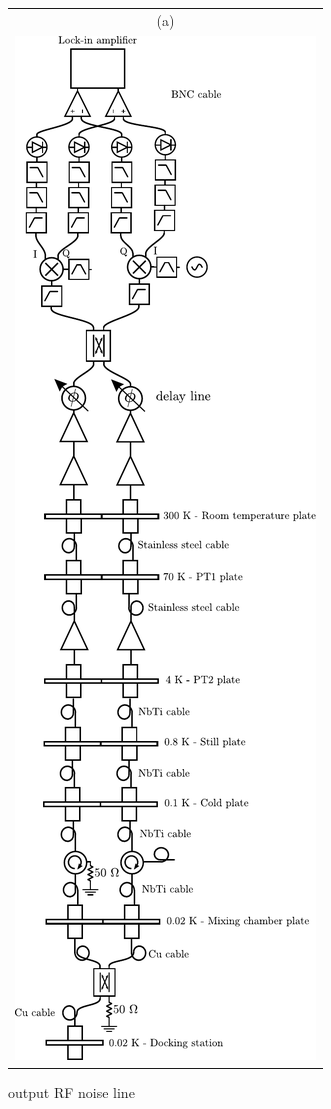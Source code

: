 \begin{figure}[hptb]
	\begin{center}
		\begin{tabular}{c}
			(a) \\ 
			
			\includegraphics[height = 18 cm]{./appB/output_RF_noise_line}
		\end{tabular}
	\end{center}
	
	\caption{output RF noise line}
	\label{fig: output RF noise line}
\end{figure}

